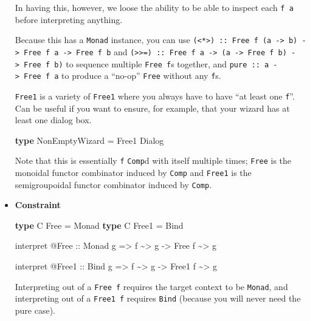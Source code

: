 \documentclass[]{article}
\newenvironment{Shaded}{}{}
\newcommand{\DataTypeTok}[1]{\textcolor[rgb]{0.56,0.13,0.00}{#1}}
\newcommand{\KeywordTok}[1]{\textcolor[rgb]{0.00,0.44,0.13}{\textbf{#1}}}
\newcommand{\NormalTok}[1]{#1}
\newcommand{\OperatorTok}[1]{\textcolor[rgb]{0.40,0.40,0.40}{#1}}
\newcommand{\OtherTok}[1]{\textcolor[rgb]{0.00,0.44,0.13}{#1}}
\begin{document}
\begin{itemize}
  In having this, however, we loose the ability to be able to inspect each
  \texttt{f\ a} before interpreting anything.

  Because this has a \texttt{Monad} instance, you can use
  \texttt{(\textless{}*\textgreater{})\ ::\ Free\ f\ (a\ -\textgreater{}\ b)\ -\textgreater{}\ Free\ f\ a\ -\textgreater{}\ Free\ f\ b}
  and
  \texttt{(\textgreater{}\textgreater{}=)\ ::\ Free\ f\ a\ -\textgreater{}\ (a\ -\textgreater{}\ Free\ f\ b)\ -\textgreater{}\ Free\ f\ b)}
  to sequence multiple \texttt{Free\ f}s together, and
  \texttt{pure\ ::\ a\ -\textgreater{}\ Free\ f\ a} to produce a ``no-op''
  \texttt{Free} without any \texttt{f}s.

  \texttt{Free1} is a variety of \texttt{Free1} where you always have to have
  ``at least one \texttt{f}''. Can be useful if you want to ensure, for example,
  that your wizard has at least one dialog box.

\begin{Shaded}
\begin{Highlighting}[]
\KeywordTok{type} \DataTypeTok{NonEmptyWizard} \OtherTok{=} \DataTypeTok{Free1} \DataTypeTok{Dialog}
\end{Highlighting}
\end{Shaded}

  Note that this is essentially \texttt{f} \texttt{Comp}d with itself multiple
  times; \texttt{Free} is the monoidal functor combinator induced by
  \texttt{Comp} and \texttt{Free1} is the semigroupoidal functor combinator
  induced by \texttt{Comp}.
\item
  \textbf{Constraint}

\begin{Shaded}
\begin{Highlighting}[]
\KeywordTok{type} \DataTypeTok{C} \DataTypeTok{Free}  \OtherTok{=} \DataTypeTok{Monad}
\KeywordTok{type} \DataTypeTok{C} \DataTypeTok{Free1} \OtherTok{=} \DataTypeTok{Bind}

\NormalTok{interpret }\OperatorTok{@}\DataTypeTok{Free}
\OtherTok{    ::} \DataTypeTok{Monad}\NormalTok{ g}
    \OtherTok{=>}\NormalTok{ f }\OperatorTok{\textasciitilde{}>}\NormalTok{ g}
    \OtherTok{{-}>} \DataTypeTok{Free}\NormalTok{ f }\OperatorTok{\textasciitilde{}>}\NormalTok{ g}

\NormalTok{interpret }\OperatorTok{@}\DataTypeTok{Free1}
\OtherTok{    ::} \DataTypeTok{Bind}\NormalTok{ g}
    \OtherTok{=>}\NormalTok{ f }\OperatorTok{\textasciitilde{}>}\NormalTok{ g}
    \OtherTok{{-}>} \DataTypeTok{Free1}\NormalTok{ f }\OperatorTok{\textasciitilde{}>}\NormalTok{ g}
\end{Highlighting}
\end{Shaded}

  Interpreting out of a \texttt{Free\ f} requires the target context to be
  \texttt{Monad}, and interpreting out of a \texttt{Free1\ f} requires
  \texttt{Bind} (because you will never need the pure case).
\end{itemize}
\end{document}
